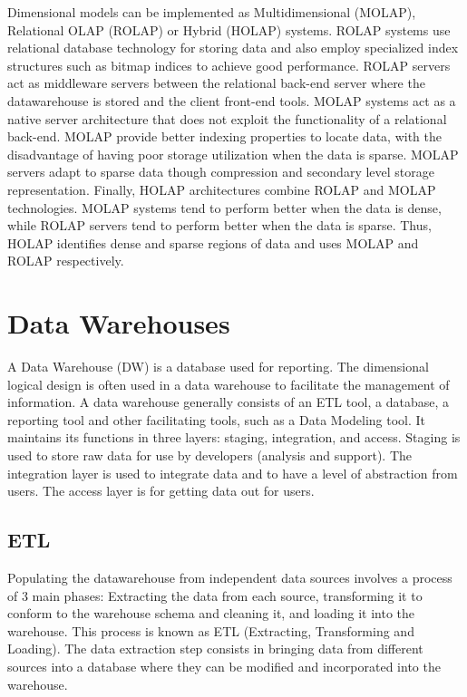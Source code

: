 \documentclass[]{article}
\begin{document}
Dimensional models can be implemented as Multidimensional (MOLAP), Relational OLAP (ROLAP) or Hybrid (HOLAP) systems. ROLAP systems use
relational database technology for storing data and also employ specialized index structures such as bitmap indices to achieve good
performance. ROLAP servers act as middleware servers between the relational back-end server where the datawarehouse is stored and the
client front-end tools. MOLAP systems act as a native server architecture that does not exploit the functionality of a relational
back-end. MOLAP provide better indexing properties to locate data, with the disadvantage of having poor storage utilization when the
data is sparse. MOLAP servers adapt to sparse data though compression and secondary level storage representation. Finally, HOLAP
architectures combine ROLAP and MOLAP technologies. MOLAP systems tend to perform better when the data is dense, while ROLAP servers
tend to perform better when the data is sparse. Thus, HOLAP identifies dense and sparse regions of data and uses MOLAP and ROLAP
respectively.



\section{Data Warehouses} %
\label{sec:data_warehouses}

A Data Warehouse (DW) is a database used for reporting. The dimensional logical design is often used in a data warehouse to facilitate
the management of information. A data warehouse generally consists of an ETL tool, a database, a reporting tool and other facilitating
tools, such as a Data Modeling tool. It maintains its functions in three layers: staging, integration, and access. Staging is used to
store raw data for use by developers (analysis and support). The integration layer is used to integrate data and to have a level of
abstraction from users. The access layer is for getting data out for users.

\subsection{ETL} %
\label{sub:etl}
Populating the datawarehouse from independent data sources involves a process of 3 main phases: Extracting the data from each source,
transforming it to conform to the warehouse schema and cleaning it, and loading it into the warehouse. This process is known as ETL
(Extracting, Transforming and Loading).
The data extraction step consists in bringing data from different sources into a database where they can be modified and incorporated
into the warehouse.
\end{document}
